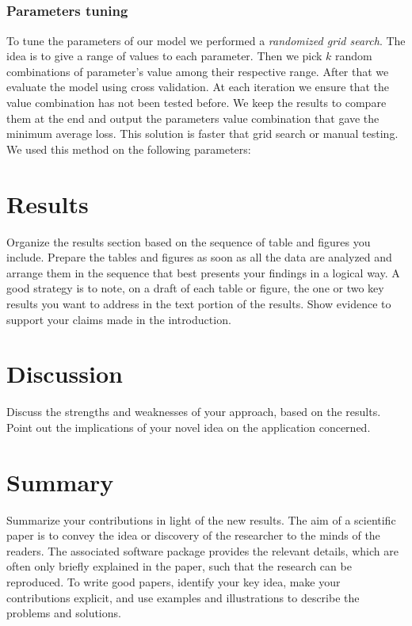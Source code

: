 \documentclass[10pt,conference,compsocconf]{IEEEtran}
\begin{document}
    \subsection{}
        \subsubsection{Parameters tuning}
            To tune the parameters of our model we performed a \textit{randomized grid search}. The idea is to give a range of values to each parameter. Then we pick $k$ random combinations of parameter's value among their respective range. After that we evaluate the model using cross validation. At each iteration we ensure that the value combination has not been tested before. We keep the results to compare them at the end and output the parameters value combination that gave the minimum average loss. This solution is faster that grid search or manual testing. We used this method on the following parameters: 
\section{Results}\label{sec: results}
    Organize the results section based on the sequence of table and
    figures you include. Prepare the tables and figures as soon as all
    the data are analyzed and arrange them in the sequence that best
    presents your findings in a logical way. A good strategy is to note,
    on a draft of each table or figure, the one or two key results you
    want to address in the text portion of the results.
    Show evidence to support your claims made in the
    introduction.
\section{Discussion}\label{sec: discussion}
    Discuss the strengths and weaknesses of your
    approach, based on the results. Point out the implications of your
    novel idea on the application concerned.
\section{Summary}\label{sec: summary}
    Summarize your contributions in light of the new
    results.
    The aim of a scientific paper is to convey the idea or discovery of
    the researcher to the minds of the readers. The associated software
    package provides the relevant details, which are often only briefly
    explained in the paper, such that the research can be reproduced.
    To write good papers, identify your key idea, make your contributions
    explicit, and use examples and illustrations to describe the problems
    and solutions.
\end{document}
